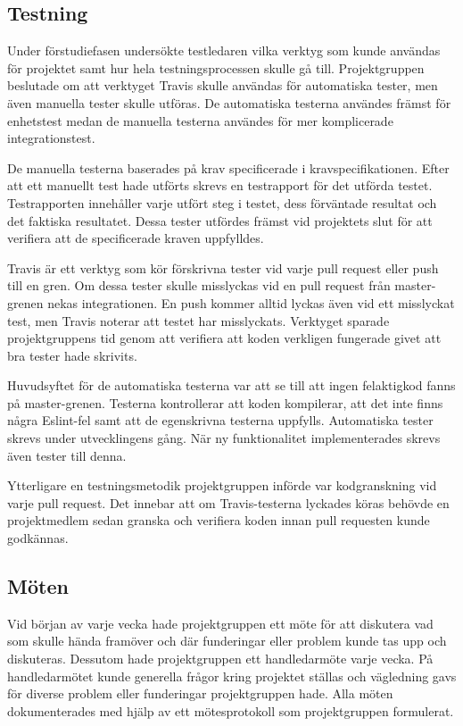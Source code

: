 \subsection{Testning}
Under förstudiefasen undersökte testledaren vilka verktyg som kunde användas för projektet samt hur hela testningsprocessen skulle gå till. Projektgruppen beslutade om att verktyget Travis skulle användas för automatiska tester, men även manuella tester skulle utföras. De automatiska testerna användes främst för enhetstest medan de manuella testerna användes för mer komplicerade integrationstest.

De manuella testerna baserades på krav specificerade i kravspecifikationen. Efter att ett manuellt test hade utförts skrevs en testrapport för det utförda testet. Testrapporten innehåller varje utfört steg i testet, dess förväntade resultat och det faktiska resultatet. Dessa tester utfördes främst vid projektets slut för att verifiera att de specificerade kraven uppfylldes.

Travis är ett verktyg som kör förskrivna tester vid varje pull request eller push till en gren. Om dessa tester skulle misslyckas vid en pull request från master-grenen nekas integrationen. En push kommer alltid lyckas även vid ett misslyckat test, men Travis noterar att testet har misslyckats. Verktyget sparade projektgruppens tid genom att verifiera att koden verkligen fungerade givet att bra tester hade skrivits.

Huvudsyftet för de automatiska testerna var att se till att ingen felaktigkod fanns på master-grenen. Testerna kontrollerar att koden kompilerar, att det inte finns några Eslint-fel samt att de egenskrivna testerna uppfylls. Automatiska tester skrevs under utvecklingens gång. När ny funktionalitet implementerades skrevs även tester till denna. 

Ytterligare en testningsmetodik projektgruppen införde var kodgranskning vid varje pull request. Det innebar att om Travis-testerna lyckades köras behövde en projektmedlem sedan granska och verifiera koden innan pull requesten kunde godkännas.

\subsection{Möten}
Vid början av varje vecka hade projektgruppen ett möte för att diskutera vad som skulle hända framöver och där funderingar eller problem kunde tas upp och diskuteras. Dessutom hade projektgruppen ett handledarmöte varje vecka. På handledarmötet kunde generella frågor kring projektet ställas och vägledning gavs för diverse problem eller funderingar projektgruppen hade. Alla möten dokumenterades med hjälp av ett mötesprotokoll som projektgruppen formulerat.

